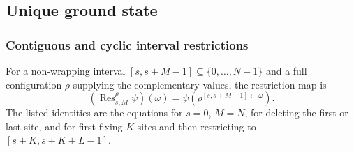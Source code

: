 \subsection{Unique ground state}

\subsubsection{Contiguous and cyclic interval restrictions}

\begin{remark}\label{rem:contiguous_window_operators}
    \leanok
    For a non-wrapping interval $[s,s+M-1] \subseteq \{0,\ldots,N-1\}$ and a
    full configuration $\rho$ supplying the complementary values, the
    restriction map is
    \[
        (\operatorname{Res}^{\rho}_{s,M}\psi)(\omega)
        =
        \psi\!\left(\rho^{[s,s+M-1]\leftarrow\omega}\right).
    \]
    The listed identities are the equations for $s=0$, $M=N$, for deleting the
    first or last site, and for first fixing $K$ sites and then restricting to
    $[s+K,s+K+L-1]$.
\end{remark}

